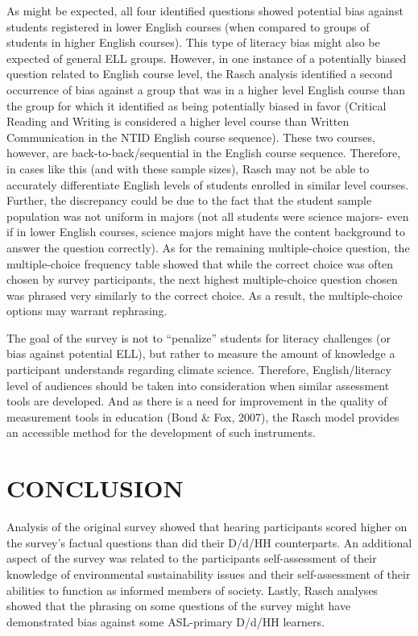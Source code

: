 \documentclass[11.5pt]{sig-alternate} %
\begin{document}
\begin{large}
As might be expected, all four identified questions showed potential bias against students registered in lower English courses (when compared to groups of students in higher English courses). This type of literacy bias might also be expected of general ELL groups. However, in one instance of a potentially biased question related to English course level, the Rasch analysis identified a second occurrence of bias against a group that was in a higher level English course than the group for which it identified as being potentially biased in favor (Critical Reading and Writing is considered a higher level course than Written Communication in the NTID English course sequence). These two courses, however, are back-to-back/sequential in the English course sequence. Therefore, in cases like this (and with these sample sizes), Rasch may not be able to accurately differentiate English levels of students enrolled in similar level courses. Further, the discrepancy could be due to the fact that the student sample population was not uniform in majors (not all students were science majors- even if in lower English courses, science majors might have the content background to answer the question correctly). As for the remaining multiple-choice question, the multiple-choice frequency table showed that while the correct choice was often chosen by survey participants, the next highest multiple-choice question chosen was phrased very similarly to the correct choice. As a result, the multiple-choice options may warrant rephrasing.

The goal of the survey is not to “penalize” students for literacy challenges (or bias against potential ELL), but rather to measure the amount of knowledge a participant understands regarding climate science. Therefore, English/literacy level of audiences should be taken into consideration when similar assessment tools are developed. And as there is a need for improvement in the quality of measurement tools in education (Bond \& Fox, 2007), the Rasch model provides an accessible method for the development of such instruments.

\section*{CONCLUSION}

Analysis of the original survey showed that hearing participants scored higher on the survey’s factual questions than did their D/d/HH counterparts.  An additional aspect of the survey was related to the participants self-assessment of their knowledge of environmental sustainability issues and their self-assessment of their abilities to function as informed members of society. Lastly, Rasch analyses showed that the phrasing on some questions of the survey might have demonstrated bias against some ASL-primary D/d/HH learners. 


\end{large}
\end{document}
